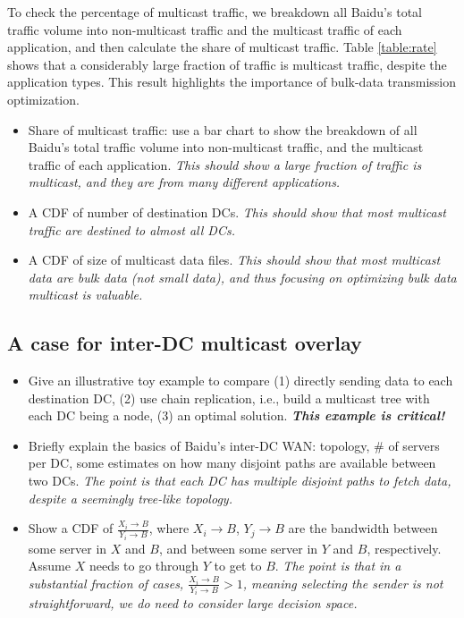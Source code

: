 To check the percentage of multicast traffic, we breakdown all Baidu's total traffic volume into non-multicast traffic and the multicast traffic of each application, and then calculate the share of multicast traffic. Table \ref{table:rate} shows that a considerably large fraction of traffic is multicast traffic, despite the application types. This result highlights the importance of bulk-data transmission optimization.



\begin{itemize}

\item Share of multicast traffic: use a bar chart to show the breakdown of all Baidu's total traffic volume into non-multicast traffic, and the multicast traffic of each application. {\em This should show a large fraction of traffic is multicast, and they are from many different applications.}

\item A CDF of number of destination DCs. {\em This should show that most multicast traffic are destined to almost all DCs.}

\item A CDF of size of multicast data files. {\em This should show that most multicast data are bulk data (not small data), and thus focusing on optimizing bulk data multicast is valuable.}

\end{itemize}

\subsection{A case for inter-DC multicast overlay}
\label{subsec:motivation:case-for}

\begin{itemize}

\item Give an illustrative toy example to compare (1) directly sending data to each destination DC, (2) use chain replication, i.e., build a multicast tree with each DC being a node, (3) an optimal solution.
{\em\bf This example is critical!}

\item Briefly explain the basics of Baidu's inter-DC WAN: topology, \# of servers per DC, some estimates on how many disjoint paths are available between two DCs.
{\em The point is that each DC has multiple disjoint paths to fetch data, despite a seemingly tree-like topology.}

\item Show a CDF of $\frac{X_i\rightarrow B}{Y_i\rightarrow B}$, where $X_i\rightarrow B$, $Y_j\rightarrow B$ are the bandwidth between some server in $X$ and $B$, and between some server in $Y$ and $B$, respectively. Assume $X$ needs to go through $Y$ to get to $B$.
{\em The point is that in a substantial fraction of cases, $\frac{X_i\rightarrow B}{Y_i\rightarrow B}>1$, meaning selecting the sender is not straightforward, we do need to consider large decision space.}

\end{itemize}

